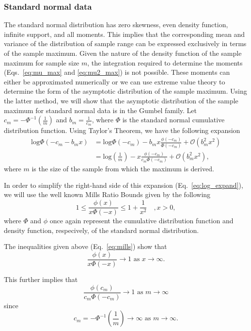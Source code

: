 \documentclass[10pt,letterpaper]{article}
\begin{document}
\subsubsection{Standard normal data}

The standard normal distribution has zero skewness, even density function, infinite support, and all moments. This implies that the corresponding mean and variance of the distribution of sample range can be expressed exclusively in terms of the sample maximum. Given the nature of the density function of the sample maximum for sample size $m$, the integration required to determine the moments (Eqs.~\ref{eq:mu_max} and \ref{eq:mu2_max}) is not possible. These moments can either be approximated numerically or we can use extreme value theory to determine the form of the asymptotic distribution of the sample maximum. Using the latter method, we will show that the asymptotic distribution of the sample maximum for standard normal data is in the Gumbel family. Let $c_m = -\Phi^{-1}\left(\frac{1}{m}\right)$ and $b_m = \frac{1}{c_m}$, where $\Phi$ is the standard normal cumulative distribution function. Using Taylor's Theorem, we have the following expansion
%
\begin{equation}\label{eq:log_expand}
\begin{aligned}
\text{log}\Phi(-c_m - b_m x) &= \text{log}\Phi(-c_m) - b_m x \frac{\phi(-c_m)}{\Phi(-c_m)} + \mathcal{O}(b^2_m x^2) \\
&= \text{log}\left(\frac{1}{m}\right) - x \frac{\phi(-c_m)}{c_m \Phi(-c_m)} + \mathcal{O}(b^2_m x^2),
\end{aligned}
\end{equation}
%
where $m$ is the size of the sample from which the maximum is derived.

In order to simplify the right-hand side of this expansion (Eq.~\ref{eq:log_expand}), we will use the well known Mills Ratio Bounds \cite{chatterjee2014} given by the following
%
\begin{equation}\label{eq:mills}
1 \leq \frac{\phi(x)}{x \Phi(-x)} \leq 1 + \frac{1}{x^2} \quad , x > 0,
\end{equation}
%
where $\Phi$ and $\phi$ once again represent the cumulative distribution function and density function, respecively, of the standard normal distribution.

The inequalities given above (Eq.~\ref{eq:mills}) show that 
%
\[\frac{\phi(x)}{x \Phi(-x)} \rightarrow 1 \text{ as } x \rightarrow \infty.
\] 

This further implies that 
%
\[
\frac{\phi(c_m)}{c_m \Phi(-c_m)} \rightarrow 1 \text{ as } m \rightarrow \infty
\] 
%
since 
%
\[
c_m = -\Phi^{-1}\left(\frac{1}{m}\right) \rightarrow \infty \text{ as } m \rightarrow \infty.
\] 
\end{document}
